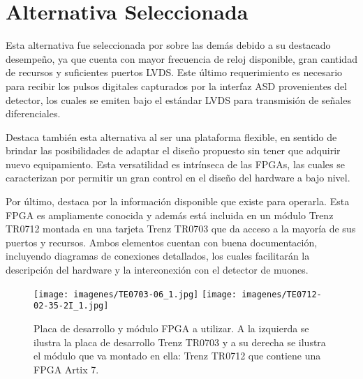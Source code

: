 \section{Alternativa Seleccionada}
\label{alternativa}


Esta alternativa fue seleccionada por sobre las demás debido a su destacado desempeño, ya que cuenta con mayor frecuencia de reloj disponible, gran cantidad de recursos y suficientes puertos LVDS. Este último requerimiento es necesario para recibir los pulsos digitales capturados por la interfaz ASD\cite{1999ATLASICs} provenientes del detector, los cuales se emiten bajo el estándar LVDS para transmisión de señales diferenciales.

Destaca también esta alternativa al ser una plataforma flexible, en sentido de brindar las posibilidades de adaptar el diseño propuesto sin tener que adquirir nuevo equipamiento. Esta versatilidad es intrínseca de las FPGAs, las cuales se caracterizan por permitir un gran control en el diseño del hardware a bajo nivel.

Por último, destaca por la información disponible que existe para operarla. Esta FPGA es ampliamente conocida y además está incluida en un módulo Trenz TR0712\cite{TrenzElectronic2019TR07012Wiki} montada en una tarjeta Trenz TR0703\cite{TrenzElectronic2019TR0703Wiki} que da acceso a la mayoría de sus puertos y recursos. Ambos elementos cuentan con buena documentación, incluyendo diagramas de conexiones detallados, los cuales facilitarán la descripción del hardware y la interconexión con el detector de muones.

\begin{figure}[H]
	\centering
	\texttt{[image: imagenes/TE0703-06\_1.jpg]}
	\texttt{[image: imagenes/TE0712-02-35-2I\_1.jpg]}
	\caption{Placa de desarrollo y módulo FPGA a utilizar. A la izquierda se ilustra la placa de desarrollo Trenz TR0703\cite{TrenzElectronic2019TR0703Wiki} y a su derecha se ilustra el módulo que va montado en ella: Trenz TR0712\cite{TrenzElectronic2019TR07012Wiki} que contiene una FPGA Artix 7\cite{Xilinx20107DS180}.}
	\label{fig:trenz}
\end{figure}


